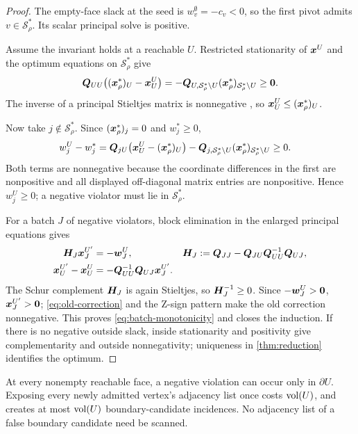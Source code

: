 \begin{proof}
The empty-face slack at the seed is $w_v^\emptyset=-c_v<0$, so the first
pivot admits $v\in\mathcal S_\rho^*$.  Its scalar principal solve is positive.

Assume the invariant holds at a reachable $U$.  Restricted stationarity of
$\bm{x}^U$ and the optimum equations on $\mathcal S_\rho^*$ give
\begin{equation}
 \bm{Q}_{UU}\bigl((\bm{x}_\rho^*)_U-\bm{x}^U_U\bigr)
 =-\bm{Q}_{U,\mathcal S_\rho^*\setminus U}(\bm{x}_\rho^*)_{\mathcal S_\rho^*\setminus U}
 \geq\bm{0}.
 \label{eq:face-comparison}
\end{equation}
The inverse of a principal Stieltjes matrix is nonnegative
\citep[Chapter~6]{berman1994nonnegative}, so
$\bm{x}^U_U\leq(\bm{x}_\rho^*)_U$.

Now take $j\notin\mathcal S_\rho^*$.  Since $(\bm{x}_\rho^*)_j=0$ and $w_j^*\geq0$,
\begin{align}
 w_j^U-w_j^*
 &=\bm{Q}_{jU}\bigl(\bm{x}^U_U-(\bm{x}_\rho^*)_U\bigr)
   -\bm{Q}_{j,\mathcal S_\rho^*\setminus U}(\bm{x}_\rho^*)_{\mathcal S_\rho^*\setminus U}
 \geq0.
 \label{eq:no-false-violation}
\end{align}
Both terms are nonnegative because the coordinate differences in the first
are nonpositive and all displayed off-diagonal matrix entries are
nonpositive.  Hence $w_j^U\geq0$; a negative violator must lie in $\mathcal S_\rho^*$.

For a batch $J$ of negative violators, block elimination in the enlarged
principal equations gives
\begin{align}
 \bm{H}_J\bm{x}^{U'}_J&=-\bm{w}^U_J,
 &\bm{H}_J&:=\bm{Q}_{JJ}-\bm{Q}_{JU}\bm{Q}_{UU}^{-1}\bm{Q}_{UJ},
 \label{eq:schur-pivot}\\
 \bm{x}^{U'}_U-\bm{x}^U_U&=-\bm{Q}_{UU}^{-1}\bm{Q}_{UJ}\bm{x}^{U'}_J.
 \label{eq:old-correction}
\end{align}
The Schur complement $\bm{H}_J$ is again Stieltjes, so
$\bm{H}_J^{-1}\geq0$.  Since $-\bm{w}_J^U>\bm{0}$,
$\bm{x}_J^{U'}>\bm{0}$; \cref{eq:old-correction} and the Z-sign pattern make the
old correction nonnegative.  This proves \cref{eq:batch-monotonicity} and
closes the induction.  If there is no negative outside slack, inside
stationarity and positivity give complementarity and outside nonnegativity;
uniqueness in \cref{thm:reduction} identifies the optimum.
\end{proof}

\begin{corollary}
\label{cor:boundary-only}
At every nonempty reachable face, a negative violation can occur only in
$\partial U$.  Exposing every newly admitted vertex's adjacency list once costs
$\operatorname{vol}(U)$, and creates at most $\operatorname{vol}(U)$ boundary-candidate incidences.  No
adjacency list of a false boundary candidate need be scanned.
\end{corollary}

